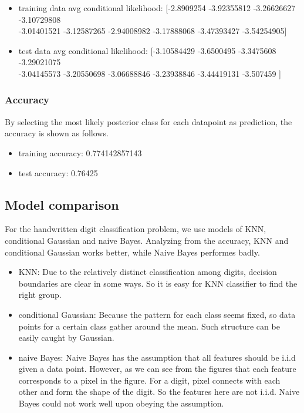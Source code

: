 \documentclass[a4paper]{article}
\begin{document}
\begin{itemize}
    \item training data avg conditional likelihood: [-2.8909254  -3.92355812 -3.26626627 -3.10729808\\-3.01401521 -3.12587265
 -2.94008982 -3.17888068 -3.47393427 -3.54254905]
    \item test data avg conditional likelihood: [-3.10584429 -3.6500495  -3.3475608  -3.29021075\\-3.04145573 -3.20550698
 -3.06688846 -3.23938846 -3.44419131 -3.507459  ]
\end{itemize}

\subsubsection{Accuracy}

By selecting the most likely posterior class for each datapoint as prediction, the accuracy is shown as follows.

\begin{itemize}
    \item training accuracy: 0.774142857143
    \item test accuracy: 0.76425
\end{itemize}

\subsection{Model comparison}

For the handwritten digit classification problem, we use models of KNN, conditional Gaussian and naive Bayes. Analyzing from the accuracy, KNN and conditional Gaussian works better, while Naive Bayes performes badly.

\begin{itemize}
    \item KNN: Due to the relatively distinct classification among digits, decision boundaries are clear in some ways. So it is easy for KNN classifier to find the right group.
    \item conditional Gaussian: Because the pattern for each class seems fixed, so data points for a certain class gather around the mean. Such structure can be easily caught by Gaussian.
    \item naive Bayes: Naive Bayes has the assumption that all features should be i.i.d given a data point. However, as we can see from the figures that each feature corresponds to a pixel in the figure. For a digit, pixel connects with each other and form the shape of the digit. So the features here are not i.i.d. Naive Bayes could not work well upon obeying the assumption.
\end{itemize}




\end{document}
